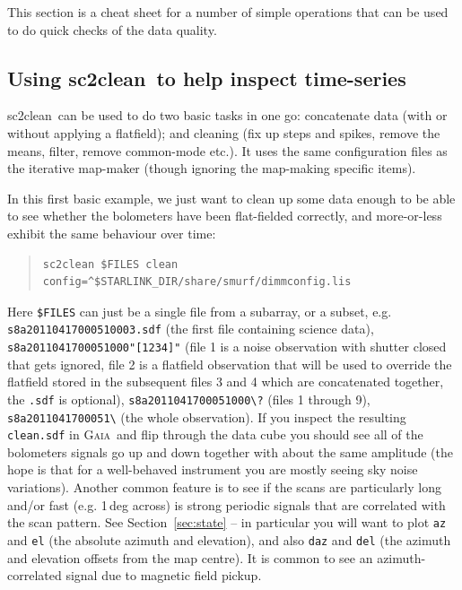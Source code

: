 \documentclass[twoside,11pt]{article}
\newcommand{\xref}[3]{#1}
\renewcommand{\_}{\texttt{\symbol{95}}}
\newenvironment{myquote}{\begin{quote}\begin{small}}{\end{small}\end{quote}}
\newcommand{\gaia}{\xref{\textsc{Gaia}}{sun214}{}}
\newcommand{\task}[1]{\textsf{#1}}
\newcommand{\clean}{\xref{\task{sc2clean}}{sun258}{SC2CLEAN}}
\begin{document}
This section is a cheat sheet for a number of simple operations that
can be used to do quick checks of the data quality.

\subsection{\label{clean}Using \clean\ to help inspect time-series}

\clean\ can be used to do two basic tasks in one go: concatenate data
(with or without applying a flatfield); and cleaning (fix up steps and
spikes, remove the means, filter, remove common-mode etc.). It uses
the same configuration files as the iterative map-maker (though
ignoring the map-making specific items).

In this first basic example, we just want to clean up some data enough
to be able to see whether the bolometers have been flat-fielded
correctly, and more-or-less exhibit the same behaviour over time:

\begin{myquote}
\begin{verbatim}
sc2clean $FILES clean config=^$STARLINK_DIR/share/smurf/dimmconfig.lis
\end{verbatim}
\end{myquote}

Here \texttt{\$FILES} can just be a single file from a subarray, or a
subset, e.g. \texttt{s8a20110417\_00051\_0003.sdf} (the first file
containing science data), \texttt{s8a20110417\_00051\_000"[1234]"}
(file 1 is a noise observation with shutter closed that gets ignored,
file 2 is a flatfield observation that will be used to override the
flatfield stored in the subsequent files 3 and 4 which are
concatenated together, the \texttt{.sdf} is optional),
\texttt{s8a20110417\_00051\_000\textbackslash?} (files 1 through 9),
\texttt{s8a20110417\_00051\_\textbackslash*} (the whole
observation). If you inspect the resulting \texttt{clean.sdf} in
\gaia\ and flip through the data cube you should see all of the
bolometers signals go up and down together with about the same
amplitude (the hope is that for a well-behaved instrument you are
mostly seeing sky noise variations). Another common feature is to see
if the scans are particularly long and/or fast (e.g. 1\,deg across) is
strong periodic signals that are correlated with the scan pattern. See
Section~\ref{sec:state} -- in particular you will want to plot
\texttt{az} and \texttt{el} (the absolute azimuth and elevation), and
also \texttt{daz} and \texttt{del} (the azimuth and elevation offsets
from the map centre). It is common to see an azimuth-correlated signal
due to magnetic field pickup.
\end{document}
